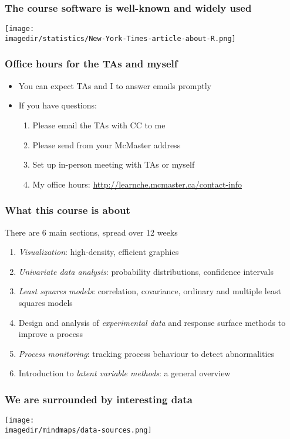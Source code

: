\begin{frame}\frametitle{The course software is well-known and widely used}
	\texttt{[image: \\imagedir/statistics/New-York-Times-article-about-R.png]}
\end{frame}

\begin{frame}\frametitle{Office hours for the TAs and myself}
	\begin{itemize}
		\item	You can expect TAs and I to answer emails promptly
		\item	If you have questions:
		\begin{enumerate}
			\item	Please email the TAs with CC to me \hfill {\tiny{\color{myOrange}{$\longleftarrow$ hopefully this solves your problem}}}
			\item	Please send from your McMaster address
			\item	Set up in-person meeting with TAs or myself
			\item	My office hours: \href{http://learnche.mcmaster.ca/contact-info}{http://learnche.mcmaster.ca/contact-info}
		\end{enumerate}
	\end{itemize}
\end{frame}

\begin{frame}\frametitle{What this course is about}
	There are 6 main sections, spread over 12 weeks
	\begin{enumerate}
		\item	\emph{Visualization}: high-density, efficient graphics
		\item	\emph{Univariate data analysis}: probability distributions, confidence intervals
		\item	\emph{Least squares models}: correlation, covariance, ordinary and multiple least squares models
		\item	Design and analysis of \emph{experimental data} and response surface methods to improve a process
		\item	\emph{Process monitoring}: tracking process behaviour to detect abnormalities
		\item	Introduction to \emph{latent variable methods}: a general overview
	\end{enumerate}
\end{frame}

\begin{frame}\frametitle{We are surrounded by interesting data}
	\begin{center}
		\texttt{[image: \\imagedir/mindmaps/data-sources.png]}
	\end{center}
\end{frame}

